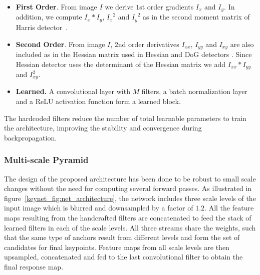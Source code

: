 \begin{itemize}
	\item \textbf{First Order}. From image $I$ we derive $1$st order gradients $I_x$ and $I_y$. In addition, we compute $I_x*I_y$, ${I_x}^2$ and ${I_y}^2$ as in the second moment matrix of Harris detector~\cite{Harris}.
    \item \textbf{Second Order}. From image $I$, $2$nd order derivatives $I_{xx}$, $I_{yy}$ and $I_{xy}$ are also included as in the Hessian matrix used in Hessian and DoG detectors \cite{HarrisLaplace,SIFT}.  Since Hessian detector uses the determinant of the Hessian matrix we add  $I_{xx}*I_{yy}$ and $I_{xy}^2$. 
    \item \textbf{Learned.}  A convolutional layer with $M$ filters, a batch normalization layer and a ReLU activation function form a learned block.
\end{itemize}

The hardcoded filters reduce the number of total learnable parameters to train the architecture, improving the stability and convergence during backpropagation.

\subsubsection{Multi-scale Pyramid }
\label{sec:pyramid}

The design of the proposed architecture has been done to be robust to small scale changes without the need for computing several forward passes. As illustrated in figure~\ref{keynet_fig:net_architecture}, the network includes three scale levels of the input image which is blurred and downsampled by a factor of $1.2$. All the feature maps resulting from the handcrafted filters are concatenated to feed the stack of learned filters in each of the scale levels. All three streams share the weights, such that the same type of anchors result from different levels and form the set of candidates for final keypoints. Feature maps from all scale levels are then upsampled, concatenated and fed to the last convolutional filter to obtain the final response map. 


